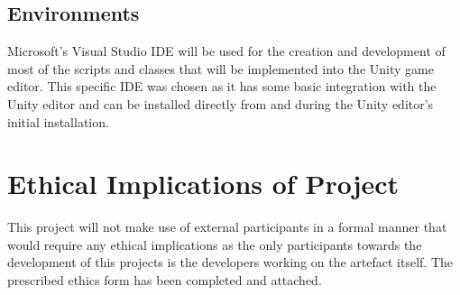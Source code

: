 \subsection{Environments}
Microsoft's Visual Studio IDE will be used for the creation and development of most of the scripts and classes that will be implemented into the Unity game editor. This specific IDE was chosen as it has some basic integration with the Unity editor and can be installed directly from and during the Unity editor's initial installation.

\section{Ethical Implications of Project}
This project will not make use of external participants in a formal manner that would require any ethical implications as the only participants towards the development of this projects is the developers working on the artefact itself. The prescribed ethics form has been completed and attached.

\newpage
